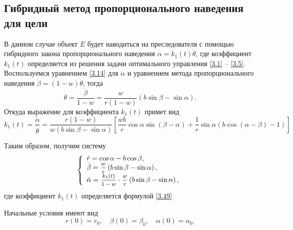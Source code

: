 \documentclass[a4paper,12pt, openany]{book}
\theoremstyle{plain} %
\theoremstyle{definition} %
\theoremstyle{remark} %
\numberwithin{equation}{chapter}
\begin{document}
{\newpage

\subsection{Гибридный метод пропорционального наведения для цели}

В данном случае объект $E$ будет наводиться на преследователя с помощью гибридного закона пропорционального наведения $\dot\alpha = k_1(t)\dot\theta$, где коэффициент $k_1(t)$ определяется из решения задачи оптимального управления \eqref{3.1} -- \eqref{3.5}. Воспользуемся уравнением \eqref{3.14} для $\dot\alpha$  и уравнением метода пропорционального наведения $\dot\beta = (1-w)\dot\theta$, тогда 
\begin{equation}\label{3.48}
\dot \theta  = \frac{{\dot \beta }}
{{1 - w}} = \frac{w}
{{r\left( {1 - w} \right)}}\left( {b\sin \beta  - \sin \alpha } \right).
\end{equation}
Откуда выражение для коэффициента $k_1(t)$ примет вид
\begin{equation}\label{3.49}
k_1 \left( t \right) = \frac{{\dot \alpha }}
{{\dot \theta }} = \frac{{r\left( {1 - w} \right)}}
{{w\left( {b\sin \beta  - \sin \alpha } \right)}}\left[ {\frac{{wb}}
{r}\cos \alpha \sin \left( {\beta  - \alpha } \right) + \frac{1}
{r}\sin \alpha \left( {b\cos \left( {\alpha  - \beta } \right) - 1} \right)} \right]
\end{equation}

Таким образом, получим систему 
\begin{equation}\label{3.50}
\left\{ {\begin{array}{*{20}l}
   {\dot r = \cos \alpha  - b\cos \beta ,} \hfill  \\
   {\dot \beta  = \mfrac{w}
{r}\left( {b\sin \beta  - \sin \alpha } \right),} \hfill  \\
   {\dot \alpha  = \mfrac{{k_1(t)}}
{{1 - w}} \cdot \mfrac{w}
{r}\left( {b\sin \beta  - \sin \alpha } \right),} \hfill  \\
 \end{array} } \right.
\end{equation}
где коэффициент $k_1(t)$ определяется формулой \eqref{3.49}

Начальные условия имеют вид
\begin{equation}\label{3.51}
r\left( 0 \right) = r_0, \quad \beta \left( 0 \right) = \beta _0, \quad  \alpha(0) = \alpha_0.
\end{equation}

}
\end{document}
